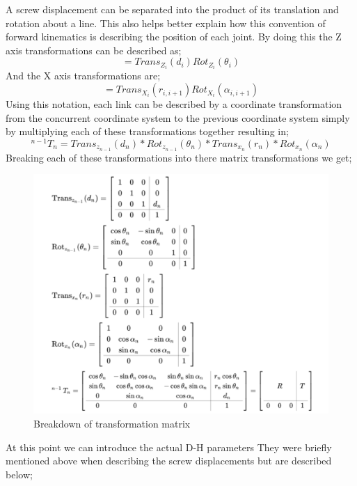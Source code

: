     A screw displacement can be separated into the product of its translation and rotation about a line. This also helps better explain how this convention of forward kinematics is describing the position of each joint. By doing this the Z axis transformations can be described as;
    \begin{equation}
    [Z_i] = Trans_{Z_i}(d_i)Rot_{Z_i}(\theta_i)
    \end{equation}
    And the X axis transformations are;
    \begin{equation}
    [X_i] = Trans_{X_i}(r_{i,i+1})Rot_{X_i}(\alpha_{i,i+1})
    \end{equation}
    Using this notation, each link can be described by a coordinate transformation from the concurrent coordinate system to the previous coordinate system simply by multiplying each of these transformations together resulting in;
    \begin{equation}
    ^{n-1}T_n=Trans_{z_{n-1}}(d_n)*Rot_{z_{n-1}}(\theta_n)*Trans_{x_n}(r_n)*Rot_{x_n}(\alpha_n)
    \end{equation}
    Breaking each of these transformations into there matrix transformations we get;
     \begin{figure}[H]
        \centering
        \includegraphics[width=150mm]{Transformation.PNG}
        \caption{Breakdown of transformation matrix}
        \label{fig:my_label}
    \end{figure}
    At this point we can introduce the actual D-H parameters They were briefly mentioned above when describing the screw displacements but are described below;
